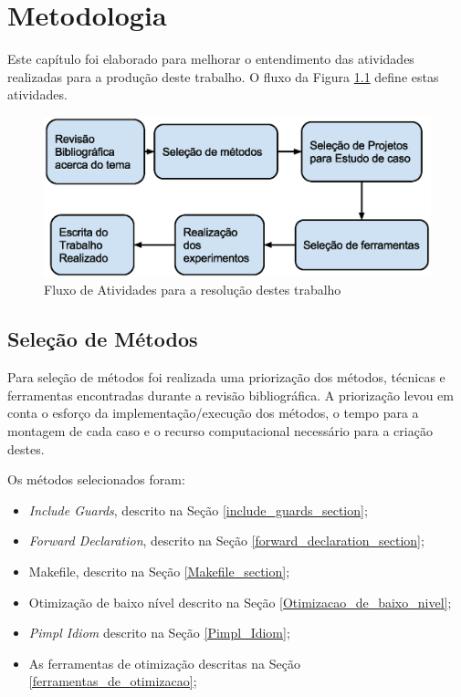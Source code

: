 \chapter[Metodologia]{Metodologia}


Este capítulo foi elaborado para melhorar o entendimento das atividades
 realizadas para a produção deste trabalho. O fluxo da Figura 
\ref{fig:fases_metodologia} define estas atividades.

\begin{figure}[h]
    \centering
        \includegraphics[keepaspectratio=true,scale=0.7]{figuras/fases_metodologia.eps}
    \caption{Fluxo de Atividades para a resolução destes trabalho}
    \label{fig:fases_metodologia}
\end{figure}

\section{Seleção de Métodos}

Para seleção de métodos foi realizada uma priorização dos métodos, técnicas e
 ferramentas encontradas durante a revisão bibliográfica. A priorização levou
 em conta o esforço da implementação/execução dos métodos, o tempo para a
 montagem de cada caso e o recurso computacional necessário para a criação
 destes.

Os métodos selecionados foram:

\begin{itemize}
	\item \textit{Include Guards}, descrito na Seção
 \ref{include_guards_section};
	\item \textit{Forward Declaration}, descrito na Seção
 \ref{forward_declaration_section};
	\item Makefile, descrito na Seção
 \ref{Makefile_section};
	\item Otimização de baixo nível descrito na Seção
 \ref{Otimizacao_de_baixo_nivel};
	\item \textit{Pimpl Idiom} descrito na Seção
 \ref{Pimpl_Idiom};
	\item As ferramentas de otimização descritas na Seção
 \ref{ferramentas_de_otimizacao};
\end{itemize}


